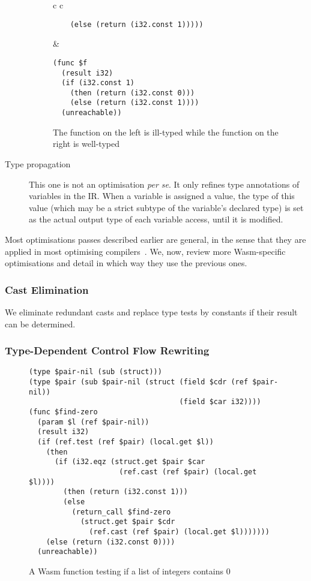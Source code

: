 \documentclass[10pt]{article}
\begin{document}
\begin{description}
\begin{figure}[h]
\begin{tabular}{c c}
\begin{minipage}{2.8in}
\begin{verbatim}
    (else (return (i32.const 1)))))
\end{verbatim}
\end{minipage}
&\begin{minipage}{2.8in}
\begin{verbatim}
(func $f
  (result i32)
  (if (i32.const 1)
    (then (return (i32.const 0)))
    (else (return (i32.const 1))))
  (unreachable))
\end{verbatim}
\end{minipage}
\end{tabular}
\caption{The function on the left is ill-typed while the function on the right
  is well-typed}\label{unreachable}
\end{figure}
  \item[Type propagation] This one is not an optimisation \emph{per se}. It only
    refines type annotations of variables in the IR. When a variable is assigned
    a value, the type of this value (which may be a strict subtype of the
    variable's declared type) is set as the actual output type of each variable
    access, until it is modified.
\end{description}

Most optimisations passes described earlier are general, in the sense that they
are applied in most optimising compilers~\cite{muchnick1997advanced}. We, now,
review more Wasm-specific optimisations and detail in which way they use the
previous ones.
\subsubsection{Cast Elimination}
We eliminate redundant casts and replace type tests by constants if their result
can be determined.

\subsubsection{Type-Dependent Control Flow Rewriting}\label{broncast}
\begin{figure}[h]
  \begin{minipage}{\widthof{(type \$pair (sub \$pair-nil (struct (field \$cdr (ref \$pair-nil))}}
\begin{verbatim}
(type $pair-nil (sub (struct)))
(type $pair (sub $pair-nil (struct (field $cdr (ref $pair-nil))
                                   (field $car i32))))
(func $find-zero
  (param $l (ref $pair-nil))
  (result i32)
  (if (ref.test (ref $pair) (local.get $l))
    (then
      (if (i32.eqz (struct.get $pair $car
                     (ref.cast (ref $pair) (local.get $l))))
        (then (return (i32.const 1)))
        (else
          (return_call $find-zero
            (struct.get $pair $cdr
              (ref.cast (ref $pair) (local.get $l)))))))
    (else (return (i32.const 0))))
  (unreachable))
\end{verbatim}
  \end{minipage}

  \caption{A Wasm function testing if a list of integers contains 0}
\end{figure}
\printbibliography
\newpage
\appendix
\end{document}
